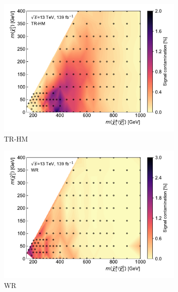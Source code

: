 \begin{figure}
\begin{subfigure}[b]{0.5\linewidth}
		\centering\includegraphics[width=1.0\textwidth]{signal_contamination/plot_TR_HM}
		\caption{TR-HM\label{fig:signal_contamination_TRHM}}
	\end{subfigure}\hfill
	\begin{subfigure}[b]{0.5\linewidth}
		\centering\includegraphics[width=1.0\textwidth]{signal_contamination/plot_WR}
		\caption{WR\label{fig:signal_contamination_WR}}
	\end{subfigure}\hfill
	\begin{subfigure}[b]{0.5\linewidth}

\end{subfigure}
\end{figure}
